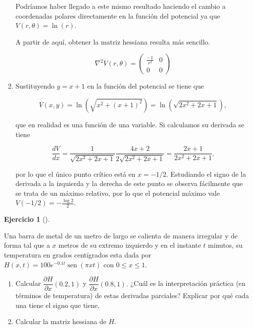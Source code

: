 \documentclass[
  a4paper,
]{scrreport}
\theoremstyle{definition}
\newtheorem{exercise}{Ejercicio}[chapter]
\theoremstyle{remark}
\begin{document}
\begin{tcolorbox}
\begin{enumerate}
  Podríamos haber llegado a este mismo resultado haciendo el cambio a
  coordenadas polares directamente en la función del potencial ya que
  \(V(r,\theta) = \ln(r)\).

  A partir de aquí, obtener la matriz hessiana resulta más sencillo.

  \[
  \nabla ^2 V(r,\theta) = 
  \begin{pmatrix}
  \frac{-1}{r^2} & 0 \\
  0 & 0 
  \end{pmatrix}
  \]
\item
  Sustituyendo \(y=x+1\) en la función del potencial se tiene que

  \[
  V(x,y) 
  = \ln(\sqrt{x^2+(x+1)^2}) 
  = \ln(\sqrt{2x^2 + 2x + 1}),
  \]

  que en realidad es una función de una variable. Si calculamos su
  derivada se tiene

  \[
  \frac{dV}{dx} 
  = \frac{1}{\sqrt{2x^2 + 2x + 1}}\frac{4x+2}{2\sqrt{2x^2 + 2x + 1}} 
  = \frac{2x+1}{2x^2+2x+1}.
  \]

  por lo que el único punto crítico está en \(x=-1/2\). Estudiando el
  signo de la derivada a la izquierda y la derecha de este punto se
  observa fácilmente que se trata de un máximo relativo, por lo que el
  potencial máximo vale \(V(-1/2)= -\frac{\log 2}{2}\).
\end{enumerate}

\end{tcolorbox}

\begin{exercise}[]\protect\hypertarget{exr-barra-metal}{}\label{exr-barra-metal}

Una barra de metal de un metro de largo se calienta de manera irregular
y de forma tal que a \(x\) metros de su extremo izquierdo y en el
instante \(t\) minutos, su temperatura en grados centígrados esta dada
por \(H(x,t) = 100e^{-0.1t}\operatorname{sen}(\pi xt)\) con
\(0\leq x \leq 1\).

\begin{enumerate}
\def\labelenumi{\alph{enumi}.}
\item
  Calcular \(\dfrac{\partial H}{\partial x}(0.2, 1)\) y
  \(\dfrac{\partial H}{\partial x}(0.8, 1).\) ¿Cuál es la interpretación
  práctica (en términos de temperatura) de estas derivadas parciales?
  Explicar por qué cada una tiene el signo que tiene.
\item
  Calcular la matriz hessiana de \(H\).
\end{enumerate}

\end{exercise}
\end{document}
